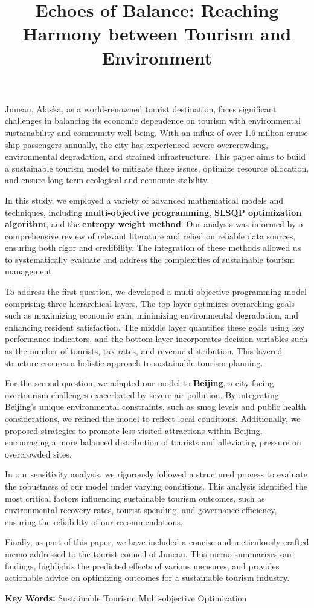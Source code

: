 \documentclass[UTF8]{mcmthesis}
\title{{\textbf{\textbf{Echoes of Balance: Reaching Harmony between Tourism and Environment}}}}
\begin{document}
    \begin{summary}
        \hspace*{2em} Juneau, Alaska, as a world-renowned tourist destination, faces significant challenges in balancing its economic dependence on tourism with environmental sustainability and community well-being. With an influx of over 1.6 million cruise ship passengers annually, the city has experienced severe overcrowding, environmental degradation, and strained infrastructure. This paper aims to build a sustainable tourism model to mitigate these issues, optimize resource allocation, and ensure long-term ecological and economic stability.

        In this study, we employed a variety of advanced mathematical models and techniques, including \textbf{multi-objective programming}, \textbf{SLSQP optimization algorithm}, and the \textbf{entropy weight method}. Our analysis was informed by a comprehensive review of relevant literature and relied on reliable data sources, ensuring both rigor and credibility. The integration of these methods allowed us to systematically evaluate and address the complexities of sustainable tourism management.

        To address the first question, we developed a multi-objective programming model comprising three hierarchical layers. The top layer optimizes overarching goals such as maximizing economic gain, minimizing environmental degradation, and enhancing resident satisfaction. The middle layer quantifies these goals using key performance indicators, and the bottom layer incorporates decision variables such as the number of tourists, tax rates, and revenue distribution. This layered structure ensures a holistic approach to sustainable tourism planning.

        For the second question, we adapted our model to \textbf{Beijing}, a city facing overtourism challenges exacerbated by severe air pollution. By integrating Beijing's unique environmental constraints, such as smog levels and public health considerations, we refined the model to reflect local conditions. Additionally, we proposed strategies to promote less-visited attractions within Beijing, encouraging a more balanced distribution of tourists and alleviating pressure on overcrowded sites.

        In our sensitivity analysis, we rigorously followed a structured process to evaluate the robustness of our model under varying conditions. This analysis identified the most critical factors influencing sustainable tourism outcomes, such as environmental recovery rates, tourist spending, and governance efficiency, ensuring the reliability of our recommendations.

        Finally, as part of this paper, we have included a concise and meticulously crafted memo addressed to the tourist council of Juneau. This memo summarizes our findings, highlights the predicted effects of various measures, and provides actionable advice on optimizing outcomes for a sustainable tourism industry.

        \noindent\textbf{Key Words: } Sustainable Tourism; Multi-objective Optimization  
    \end{summary}
\end{document}
